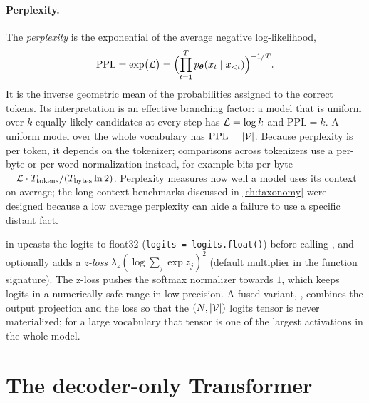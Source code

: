 \paragraph{Perplexity.} The \emph{perplexity} is the exponential of the average
negative log-likelihood,
\begin{equation}\label{eq:c01-ppl}
  \mathrm{PPL} = \exp\bigl(\mathcal{L}\bigr)
  = \Bigl(\prod_{t=1}^{T} p_{\bm{\theta}}(x_t \mid x_{<t})\Bigr)^{-1/T}.
\end{equation}
It is the inverse geometric mean of the probabilities assigned to the correct tokens. Its
interpretation is an effective branching factor: a model that is uniform over $k$ equally
likely candidates at every step has $\mathcal{L} = \log k$ and $\mathrm{PPL} = k$. A uniform model
over the whole vocabulary has $\mathrm{PPL} = \left\lvert \mathcal{V}\right\rvert$. Because perplexity is per
token, it depends on the tokenizer; comparisons across tokenizers use a per-byte or per-word
normalization instead, for example bits per byte
$= \mathcal{L} \cdot T_{\text{tokens}} / (T_{\text{bytes}} \ln 2)$. Perplexity measures how well a
model uses its context on average; the long-context benchmarks discussed in
\cref{ch:taxonomy} were designed because a low average perplexity can hide a failure to use
a specific distant fact.

\begin{implnote}[title={In the code: cross-entropy with z-loss}]
 in
upcasts the logits to float32 (\texttt{logits = logits.float()}) before calling
, and optionally adds a \emph{z-loss}
$\lambda_z (\log\sum_j \exp z_j)^2$ (default multiplier  in the function
signature). The z-loss pushes the softmax normalizer towards $1$, which keeps logits in a
numerically safe range in low precision. A fused variant,
, combines the output projection and the loss so that
the $(N, \left\lvert \mathcal{V}\right\rvert)$ logits tensor is never materialized; for a large vocabulary
that tensor is one of the largest activations in the whole model.
\end{implnote}

\section{The decoder-only Transformer}\label{sec:c01-transformer}

